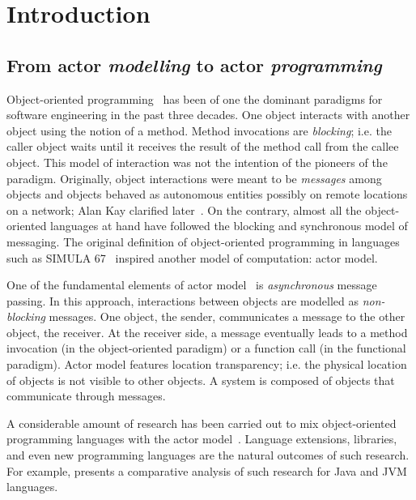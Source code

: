 
\chapter[Introduction]{Introduction}
\label{ch:intro}

\section{From actor \emph{modelling} to actor \emph{programming}}
\label{sec:intro:abs}

Object-oriented programming~\cite{booch1982object,meyer1988object} has been of one the dominant paradigms for software engineering in the past three decades.
One object interacts with another object using the notion of a method.
Method invocations are \emph{blocking}; i.e. the caller object waits until it receives the result of the method call from the callee object.
This model of interaction was not the intention of the pioneers of the paradigm.
Originally, object interactions were meant to be \emph{messages} among objects and objects behaved as autonomous entities possibly on remote locations on a network; Alan Kay clarified later~\cite{alank1,alank2}. 
On the contrary, almost all the object-oriented languages at hand have followed the blocking and synchronous model of messaging. 
The original definition of object-oriented programming in languages such as SIMULA 67~\cite{Dahl:1968:simula} inspired another model of computation: actor model.  

One of the fundamental elements of actor model~\cite{actors:agha,agha97} is \emph{asynchronous} message passing.
In this approach, interactions between objects are modelled as \emph{non-blocking} messages.
One object, the sender, communicates a message to the other object, the receiver.
At the receiver side, a message eventually leads to a method invocation (in the object-oriented paradigm) or a function call (in the functional paradigm).
Actor model features location transparency; i.e. the physical location of objects is not visible to other objects.
A system is composed of objects that communicate through messages.

A considerable amount of research has been carried out to mix object-oriented programming languages with the actor model~\cite{philippsen2000survey}. 
Language extensions, libraries, and even new programming languages are the natural outcomes of such research.
For example, \cite{actor_frameworks_jvm:agha} presents a comparative analysis of such research for Java and JVM languages.

